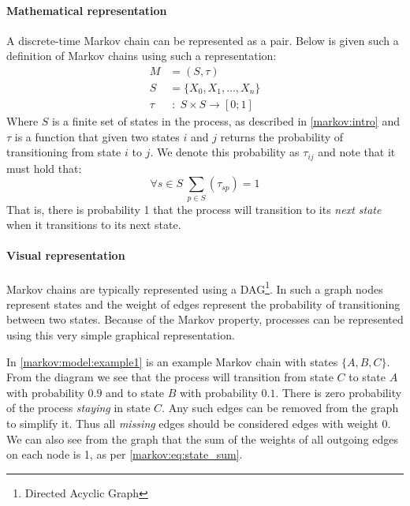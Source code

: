 \paragraph{Mathematical representation}
A discrete-time Markov chain can be represented as a pair.
Below is given such a definition of Markov chains using such a representation:
\begin{align}
M & = (S, \tau)\\
S & = \{X_0, X_1, \dots, X_n\} \nonumber\\
\tau & \; : \; S \times S \rightarrow [0; 1] \nonumber
\end{align}
Where $S$ is a finite set of states in the process, as described in \cref{markov:intro} and $\tau$ is a function that given two states $i$ and $j$ returns the probability of transitioning from state $i$ to $j$.
We denote this probability as $\tau_{ij}$ and note that it must hold that:
\begin{equation}\label{markov:eq:state_sum}
\forall s \in S \: \sum_{p \in S} (\tau_{sp}) = 1
\end{equation}
That is, there is probability 1 that the process will transition to its \emph{next state} when it transitions to its next state.

\paragraph{Visual representation}
Markov chains are typically represented using a DAG\footnote{Directed Acyclic Graph}.
In such a graph nodes represent states and the weight of edges represent the probability of transitioning between two states.
Because of the Markov property, processes can be represented using this very simple graphical representation.

In \cref{markov:model:example1} is an example Markov chain with states $\{A, B, C\}$.
From the diagram we see that the process will transition from state $C$ to state $A$ with probability $0.9$ and to state $B$ with probability $0.1$.
There is zero probability of the process \textit{staying} in state $C$.
Any such edges can be removed from the graph to simplify it.
Thus all \emph{missing} edges should be considered edges with weight 0.
We can also see from the graph that the sum of the weights of all outgoing edges on each node is 1, as per \cref{markov:eq:state_sum}.

